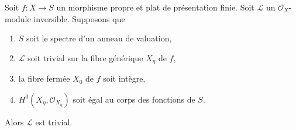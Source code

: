 \begin{lemma}
\label{lemma-triviality-generic-fibre-valuation-ring}
Soit $f : X \to S$ un morphisme propre et plat de présentation finie.
Soit $\mathcal{L}$ un $\mathcal{O}_X$-module inversible.
Supposons que
\begin{enumerate}
\item $S$ soit le spectre d'un anneau de valuation,
\item $\mathcal{L}$ soit trivial sur la fibre générique $X_\eta$ de $f$,
\item la fibre fermée $X_0$ de $f$ soit intègre,
\item $H^0(X_\eta, \mathcal{O}_{X_\eta})$ soit égal au corps des fonctions de $S$.
\end{enumerate}
Alors $\mathcal{L}$ est trivial.
\end{lemma}

